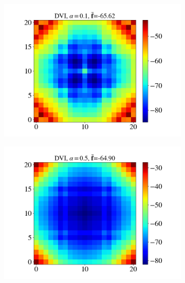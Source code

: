\begin{itemize}
\begin{figure}[H]
\begin{subfigure}{0.32\columnwidth}
			\includegraphics[width=1.0\textwidth]{images/CD/Example7/20/N_21_DVI_0.1.png}
		\end{subfigure}
		\begin{subfigure}{0.32\columnwidth}	
			\centering
			\includegraphics[width=1.0\textwidth]{images/CD/Example7/20/N_21_DVI_0.5.png}
		\end{subfigure}
		\begin{subfigure}{0.32\columnwidth}	
			\centering

\end{subfigure}
\end{figure}
\end{itemize}
